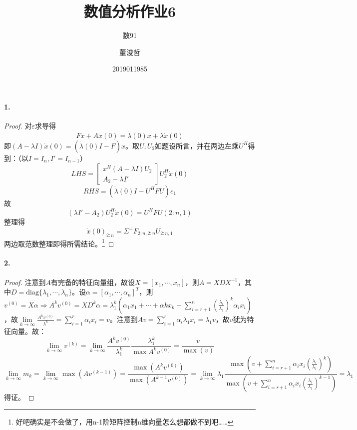 \documentclass{ctexart}
\title{数值分析作业6}
\author{数91\and 董浚哲\and 2019011985}
\begin{document}
\maketitle
\newcommand{\R}{\mathbf{R}}
\newcommand{\dd}{\,\mathrm{d}}
\newcommand{\st}{\text{ s.t. }}
\newcommand{\pp}[2]{\frac{\partial #1}{\partial #2}}
\newcommand{\nm}[1]{\left\|#1\right\|}

\paragraph{1.}
\begin{proof}
对$\varepsilon$求导得
\[Fx+A\dot x(0)=\dot\lambda(0)x+\lambda \dot x(0)\]
即$(A-\lambda I)\dot x(0)=(\dot\lambda(0) I-F)x$。取$U,U_2$如题设所言，并在两边左乘$U^H$得到：（以$I=I_n,I'=I_{n-1}$）
\[LHS=\begin{bmatrix}x^H(A-\lambda I)U_2\\ A_2-\lambda I'\end{bmatrix}U_2^H \dot x(0)\]
\[RHS=(\dot\lambda(0)I-U^HFU)e_1\]
故\[(\lambda I'-A_2)U_2^H\dot x(0)=U^HFU(2:n,1)\]
整理得
\[\dot x(0)_{2:n}=\Sigma^\perp F_{2:n,2:n}U_{2:n,1}\]
两边取范数整理即得所需结论。\footnote{好吧确实是不会做了，用n-1阶矩阵控制n维向量怎么想都做不到吧……}
\end{proof}

\paragraph{2.}
\begin{proof}
注意到$A$有完备的特征向量组，故设$X=[x_1,\cdots,x_n]$，则$A=XDX^{-1}$，其中$D=\mathrm{diag}\{\lambda_1,\cdots,\lambda_n\}$。设$\alpha=[\alpha_1,\cdots,\alpha_n]^T$，则$v^{(0)}=X\alpha\Rightarrow A^kv^{(0)}=XD^k\alpha=\lambda^k_1(\alpha_1 x_1+\cdots +\alpha k x_k+\sum_{i=r+1}^n(\frac{\lambda_i}{\lambda_1})^k\alpha_i x_i)$，故$\lim\limits_{k\to\infty}\frac{A^kv^{(0)}}{\lambda^k}=\sum_{i=1}^r \alpha_i x_i=v$。注意到$Av=\sum_{i=1}^r\alpha_i\lambda_1 x_i=\lambda_1 v$，故$v$犹为特征向量。故：
\[\lim_{k\to\infty}v^{(k)}=\lim_{k\to\infty}\frac{A^kv^{(0)}}{\lambda_1^k}\frac{\lambda_1^k}{\max{A^kv^{(0)}}}=\frac{v}{\max(v)}\]
\[\lim_{k\to\infty}m_k=\lim_{k\to\infty}\max(Av^{(k-1)})=\frac{\max(A^kv^{(0)})}{\max(A^{k-1}v^{(0)})}=\lim_{k\to\infty}\lambda_1\frac{\max (v+\sum\limits_{i=r+1}^n \alpha_i x_i(\frac{\lambda_i}{\lambda_1})^k)}{\max (v+\sum\limits_{i=r+1}^n \alpha_i x_i(\frac{\lambda_i}{\lambda_1})^{k-1})}=\lambda_1\]
得证。
\end{proof}
\end{document}
